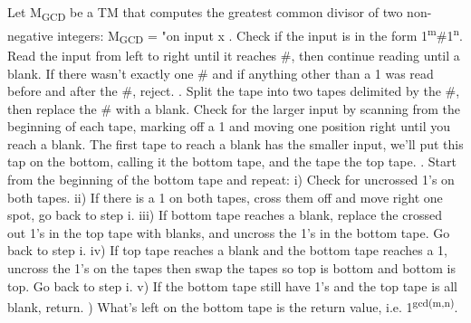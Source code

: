 \documentclass[11pt]{article}
\newcommand\question[2]{
\shadowbox{
\begin{minipage}{45em}\vspace{1ex}\textbf{Problem #1}
\newline
\vspace{1ex}
\end{minipage}
}
\vspace{1ex}
}
\begin{document}
\question{3}{John X and Jane Y} %

\begin{enumerate}

Let M\textsubscript{GCD} be a TM that computes the greatest common divisor of two non-negative integers:
\newline
\newline 
M\textsubscript{GCD} = "on input x
\newline
{}. Check if the input is in the form 1\textsuperscript{m}\#1\textsuperscript{n}. Read the input from left to right until it reaches \#, then continue reading until a blank. If there wasn't exactly one \# and if anything other than a 1 was read before and after the \#, reject.  
\newline
{}. Split the tape into two tapes delimited by the \#, then replace the \# with a blank. Check for the larger input by scanning from the beginning of each tape, marking off a 1 and moving one position right until you reach a blank. The first tape to reach a blank has the smaller input, we'll put this tap on the bottom, calling it the bottom tape, and the tape the top tape. 
\newline 
{}. Start from the beginning of the bottom tape and repeat:
\newline
\newline
i) Check for uncrossed 1's on both tapes. 
\newline
\newline
ii) If there is a 1 on both tapes, cross them off and move right one spot, go back to step i.
\newline 
\newline
iii) If bottom tape reaches a blank, replace the crossed out 1's in the top tape with blanks, and uncross the 1's in the bottom tape. Go back to step i.
\newline 
\newline
iv) If top tape reaches a blank and the bottom tape reaches a 1, uncross the 1's on the tapes then swap the tapes so top is bottom and bottom is top. Go back to step i.
\newline
\newline
v) If the bottom tape still have 1's and the top tape is all blank, return.
\newline
{}) What's left on the bottom tape is the return value, i.e. 1\textsuperscript{gcd(m,n)}.





\end{enumerate}
\newpage
\end{document}
